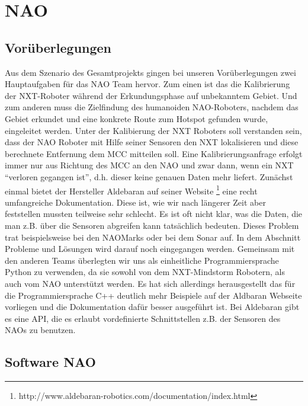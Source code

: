 \chapter{NAO}\label{NAO}

\section{Vorüberlegungen}
Aus dem Szenario des Gesamtprojekts gingen bei unseren Vorüberlegungen zwei Hauptaufgaben für das NAO Team hervor. Zum einen ist das die Kalibrierung der NXT-Roboter während der Erkundungsphase auf unbekanntem Gebiet. Und zum anderen muss die Zielfindung des humanoiden NAO-Roboters, nachdem das Gebiet erkundet und eine konkrete Route zum Hotspot gefunden wurde, eingeleitet werden.
Unter der Kalibierung der NXT Roboters soll verstanden sein, dass der NAO Roboter mit Hilfe seiner Sensoren den NXT lokalisieren und diese berechnete Entfernung dem MCC mitteilen soll. Eine Kalibrierungsanfrage erfolgt immer nur aus Richtung des MCC an den NAO und zwar dann, wenn ein NXT ``verloren gegangen ist'', d.h. dieser keine genauen Daten mehr liefert.
Zunächst einmal bietet der Hersteller Aldebaran auf seiner Website%
	\footnote{http://www.aldebaran-robotics.com/documentation/index.html} eine recht umfangreiche Dokumentation. Diese ist, wie wir nach längerer Zeit aber feststellen mussten teilweise sehr schlecht. Es ist oft nicht klar, was die Daten, die man z.B. über die Sensoren abgreifen kann tatsächlich bedeuten. Dieses Problem trat beispielsweise bei den NAOMarks oder bei dem Sonar auf. In dem Abschnitt Probleme und Lösungen wird darauf noch eingegangen werden.
Gemeinsam mit den anderen Teams überlegten wir uns als einheitliche Programmiersprache Python zu verwenden, da sie sowohl von dem NXT-Mindstorm Robotern, als auch vom NAO unterstützt werden. Es hat sich allerdings herausgestellt das für die Programmiersprache C++ deutlich mehr Beispiele auf der Aldbaran Webseite vorliegen und die Dokumentation dafür besser ausgeführt ist.
Bei Aldebaran gibt es eine API, die es erlaubt vordefinierte Schnittstellen z.B. der Sensoren des NAOs zu benutzen.

\section{Software NAO}
